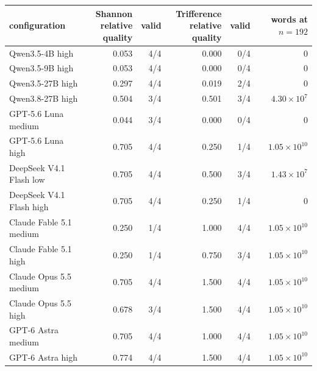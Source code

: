 \begin{tabular}{@{}lrrrrr@{}}
\toprule
configuration & \shortstack{Shannon\\relative quality} & valid & \shortstack{Trifference\\relative quality} & valid & words at $n=192$ \\
\midrule
Qwen3.5-4B high & 0.053 & 4/4 & 0.000 & 0/4 & 0 \\
Qwen3.5-9B high & 0.053 & 4/4 & 0.000 & 0/4 & 0 \\
Qwen3.5-27B high & 0.297 & 4/4 & 0.019 & 2/4 & 0 \\
Qwen3.8-27B high & 0.504 & 3/4 & 0.501 & 3/4 & $4.30\times10^{7}$ \\
GPT-5.6 Luna medium & 0.044 & 3/4 & 0.000 & 0/4 & 0 \\
GPT-5.6 Luna high & 0.705 & 4/4 & 0.250 & 1/4 & $1.05\times10^{10}$ \\
DeepSeek V4.1 Flash low & 0.705 & 4/4 & 0.500 & 3/4 & $1.43\times10^{7}$ \\
DeepSeek V4.1 Flash high & 0.705 & 4/4 & 0.250 & 1/4 & 0 \\
Claude Fable 5.1 medium & 0.250 & 1/4 & 1.000 & 4/4 & $1.05\times10^{10}$ \\
Claude Fable 5.1 high & 0.250 & 1/4 & 0.750 & 3/4 & $1.05\times10^{10}$ \\
Claude Opus 5.5 medium & 0.705 & 4/4 & 1.500 & 4/4 & $1.05\times10^{10}$ \\
Claude Opus 5.5 high & 0.678 & 3/4 & 1.500 & 4/4 & $1.05\times10^{10}$ \\
GPT-6 Astra medium & 0.705 & 4/4 & 1.000 & 4/4 & $1.05\times10^{10}$ \\
GPT-6 Astra high & 0.774 & 4/4 & 1.500 & 4/4 & $1.05\times10^{10}$ \\
\bottomrule
\end{tabular}
